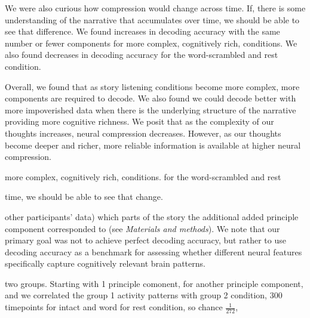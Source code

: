 We were also curious how compression would change across time. If, there is
some understanding of the narrative that accumulates over time, we should be
able to see that difference. We found increases in decoding accuracy with the
same number or fewer components for more complex, cognitively rich, conditions.
We also found decreases in decoding accuracy for the word-scrambled and rest
condition.

Overall, we found that as story listening conditions become more complex, more
components are required to decode. We also found we could decode better with
more impoverished data when there is the underlying structure of the narrative
providing more cognitive richness. We posit that as the complexity of our
thoughts increases, neural compression decreases. However, as our thoughts
become deeper and richer, more reliable information is available at higher
neural compression.



more complex, cognitively rich, conditions. %
for the word-scrambled and rest %


  
  
  
  time, we should be able to see that change.
  



other participants’ data) which parts of the story the additional added %
principle component corresponded to (see \textit{Materials and methods}). We
note that our primary goal was not to achieve perfect decoding accuracy, but
rather to use decoding accuracy as a benchmark for assessing whether different
neural features specifically capture cognitively relevant brain patterns.

two groups. Starting with 1 principle comonent, for %
another principle component, and we correlated the group 1 activity patterns
with group 2 %
condition, 300 timepoints for intact and word %
for rest condition, so chance %
$\frac{1}{272}$, %
 

